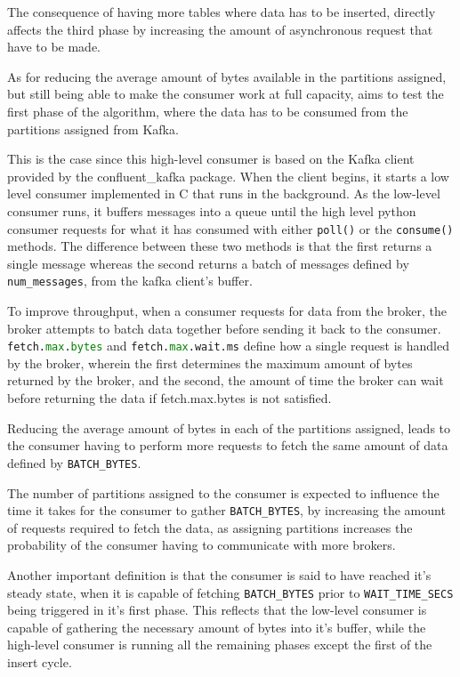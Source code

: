 The consequence of having more tables where data has to be inserted, directly
affects the third phase by increasing the amount of asynchronous request that
have to be made.

As for reducing the average amount of bytes available in the partitions
assigned, but still being able to make the consumer work at full capacity, aims
to test the first phase of the algorithm, where the data has to be consumed from
the partitions assigned from Kafka.

This is the case since this high-level consumer is based on the Kafka client
provided by the confluent\_kafka package. When the client begins, it starts a
low level consumer implemented in C that runs in the background. As the
low-level consumer runs, it buffers messages into a queue until the high level
python consumer requests for what it has consumed with either
\lstinline[language=Python]{poll()} or the
\lstinline[language=Python]{consume()} methods. The difference between these two
methods is that the first returns a single message whereas the second returns a
batch of messages defined by \lstinline[language=Python]{num_messages}, from the
kafka client's buffer. 

To improve throughput, when a consumer requests for data from the broker, the
broker attempts to batch data together before sending it back to the consumer.
\lstinline[language=Python]{fetch.max.bytes} and
\lstinline[language=Python]{fetch.max.wait.ms} define how a single request is
handled by the broker, wherein the first determines the maximum amount of bytes
returned by the broker, and the second, the amount of time the broker can wait
before returning the data if fetch.max.bytes is not satisfied.

Reducing the average amount of bytes in each of the partitions assigned, leads
to the consumer having to perform more requests to fetch the same amount of data
defined by \lstinline[language=Python]{BATCH_BYTES}. 

The number of partitions assigned to the consumer is expected to influence the
time it takes for the consumer to gather
\lstinline[language=Python]{BATCH_BYTES}, by increasing the amount of requests
required to fetch the data, as assigning partitions increases the probability of
the consumer having to communicate with more brokers. 

Another important definition is that the consumer is said to have reached it's
steady state, when it is capable of fetching
\lstinline[language=Python]{BATCH_BYTES} prior to
\lstinline[language=Python]{WAIT_TIME_SECS} being triggered in it's first phase.
This reflects that the low-level consumer is capable of gathering the necessary
amount of bytes into it's buffer, while the high-level consumer is running all
the remaining phases except the first of the insert cycle.

